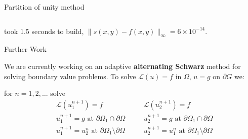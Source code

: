 \documentclass{beamer}
\begin{document}
\begin{frame}{Partition of unity method}
\begin{columns}[t]
\end{columns}

\begin{center}
took 1.5 seconds to build, $\| s(x,y)-f(x,y)\|_{\infty} = 6\times10^{-14}$.	
\end{center}

\end{frame}

\begin{frame}{Further Work}
	\begin{center}
		We are currently working on an adaptive \textbf{alternating Schwarz} method for solving boundary value problems. To solve $\mathcal{L}(u)=f$ in $\Omega$, $u=g$ on $\partial G$ we:
	\end{center}
	
	\begin{center}
	for $n=1,2,\dots$ solve
	\begin{equation*}
	\begin{aligned}
	&\mathcal{L}(u_1^{n+1})=f \\
	&u_1^{n+1} = g \text{ at } \partial\Omega_1 \cap \partial\Omega \\
	&u_1^{n+1} = u_2^{n} \text{ at } \partial\Omega_1 \setminus \partial\Omega 
	\end{aligned} \quad 	\begin{aligned}
	&\mathcal{L}(u_2^{n+1})=f \\
	&u_2^{n+1} = g \text{ at } \partial\Omega_1 \cap \partial\Omega \\
	&u_2^{n+1} = u_1^{n} \text{ at } \partial\Omega_1 \setminus \partial\Omega 
	\end{aligned}
	\end{equation*}	
	\end{center}

\end{frame}
\end{document}
